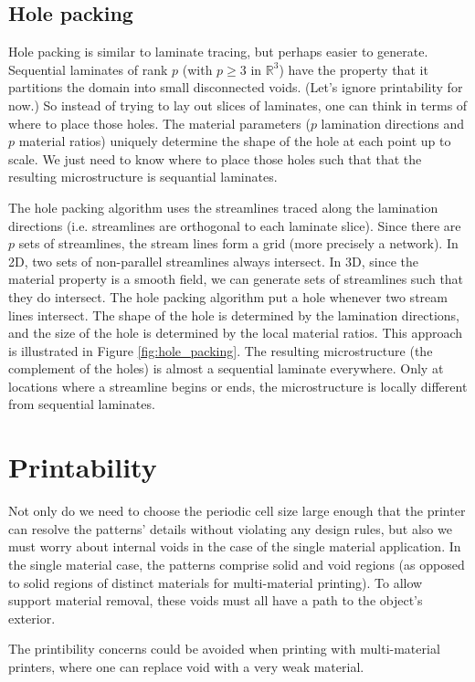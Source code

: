 \documentclass[10pt]{article}
\begin{document}
\subsection{Hole packing}
Hole packing is similar to laminate tracing, but perhaps easier to generate.  Sequential
laminates of rank $p$ (with $p\ge3$ in $\mathbb{R}^3$) have the property that it
partitions the domain into small disconnected voids.  (Let's ignore printability
for now.)  So instead of trying to lay out slices of laminates, one can
think in terms of where to place those holes.  The material parameters ($p$
lamination directions and $p$ material ratios) uniquely determine the shape of
the hole at each point up to scale.   We just need to know where to place those
holes such that that the resulting microstructure is sequantial laminates.

The hole packing algorithm uses the streamlines traced along the lamination
directions (i.e. streamlines are orthogonal to each laminate slice).  Since
there are $p$ sets of streamlines, the stream lines form a grid (more precisely
a network).  In 2D, two
sets of non-parallel streamlines always intersect.  In 3D, since the material
property is a smooth field, we can generate sets of streamlines such that they
do intersect.  The hole packing algorithm put a hole whenever two stream
lines intersect. The shape of the hole is determined by the lamination
directions, and the size of the hole is determined by the local material ratios.
This approach is illustrated in Figure \ref{fig:hole_packing}.  The resulting
microstructure (the complement of the holes) is almost a sequential laminate
everywhere.  Only at locations where a streamline begins or ends, the
microstructure is locally different from sequential laminates.


\section{Printability}
Not only do we need to choose the periodic cell size large enough that the
printer can resolve the patterns' details without violating any design rules,
but also we must worry about internal voids in the case of the single material
application. In the single material case, the patterns comprise solid and void
regions (as opposed to solid regions of distinct materials for multi-material
printing). To allow support material removal, these voids must all have a path
to the object's exterior.

The printibility concerns could be avoided when printing with multi-material
printers, where one can replace void with a very weak material.
\end{document}
